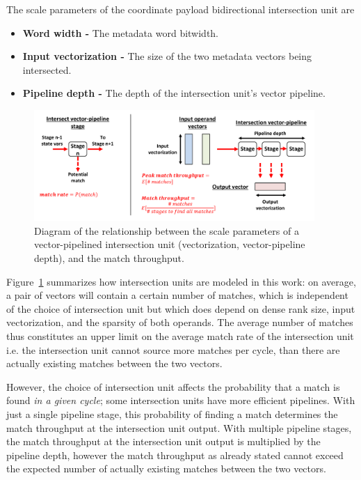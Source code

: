 The scale parameters of the coordinate payload bidirectional intersection unit are

\begin{itemize}
    \item \textbf{Word width -} The metadata word bitwidth.
    \item \textbf{Input vectorization -} The size of the two metadata vectors being intersected.
    \item \textbf{Pipeline depth -} The depth of the intersection unit's vector pipeline.
\end{itemize}

\begin{figure}[ht]
    \centering
    \includegraphics[width=0.95\textwidth]{figures/isect_model.pdf}
    \caption{Diagram of the relationship between the scale parameters of a vector-pipelined intersection unit (vectorization, vector-pipeline depth), and the match throughput.}
    \label{fig:isect_model}
\end{figure}

Figure~\ref{fig:isect_model} summarizes how intersection units are modeled in this work: on average, a pair of vectors will contain a certain number of matches, which is independent of the choice of intersection unit but which does depend on dense rank size, input vectorization, and the sparsity of both operands. The average number of matches thus constitutes an upper limit on the average match rate of the intersection unit i.e. the intersection unit cannot source more matches per cycle, than there are actually existing matches between the two vectors. 

However, the choice of intersection unit affects the probability that a match is found \textit{in a given cycle}; some intersection units have more efficient pipelines. With just a single pipeline stage, this probability of finding a match determines the match throughput at the intersection unit output. With multiple pipeline stages, the match throughput at the intersection unit output is multiplied by the pipeline depth, however the match throughput as already stated cannot exceed the expected number of actually existing matches between the two vectors.

